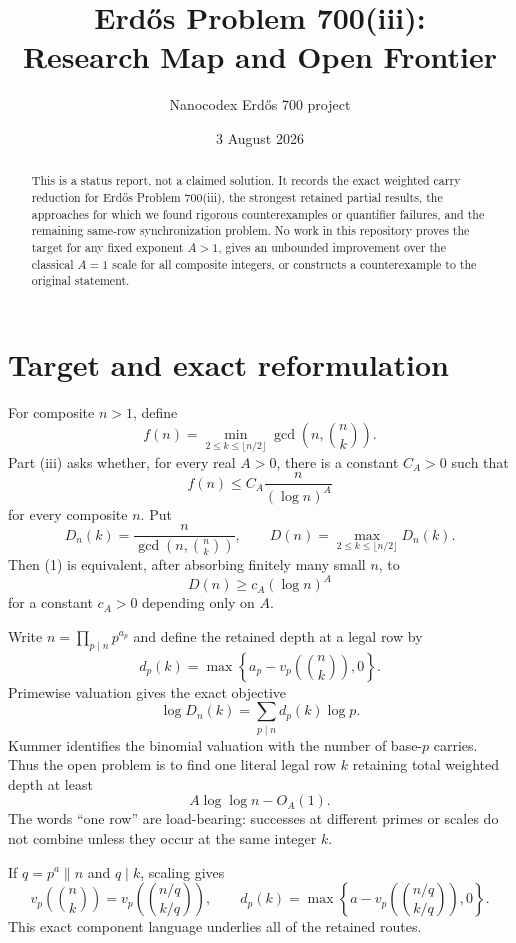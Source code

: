 \documentclass[11pt]{article}
\title{Erd\H{o}s Problem 700(iii):\\
Research Map and Open Frontier}
\author{Nanocodex Erd\H{o}s 700 project}
\date{3 August 2026}
\newcommand{\choosef}[2]{\binom{#1}{#2}}
\begin{document}
\maketitle

\begin{abstract}
This is a status report, not a claimed solution.  It records the exact
weighted carry reduction for Erd\H{o}s Problem 700(iii), the strongest
retained partial results, the approaches for which we found rigorous
counterexamples or quantifier failures, and the remaining same-row
synchronization problem.  No work in this repository proves the target for
any fixed exponent $A>1$, gives an unbounded improvement over the classical
$A=1$ scale for all composite integers, or constructs a counterexample to the
original statement.
\end{abstract}

\section{Target and exact reformulation}

For composite $n>1$, define
\[
 f(n)=\min_{2\leq k\leq\lfloor n/2\rfloor}
       \gcd\!\left(n,\choosef nk\right).
\]
Part (iii) asks whether, for every real $A>0$, there is a constant $C_A>0$
such that
\[
 f(n)\leq C_A\frac{n}{(\log n)^A}                         \tag{1}
\]
for every composite $n$.  Put
\[
 D_n(k)=\frac{n}{\gcd(n,\choosef nk)},\qquad
 D(n)=\max_{2\leq k\leq\lfloor n/2\rfloor}D_n(k).
\]
Then (1) is equivalent, after absorbing finitely many small $n$, to
\[
 D(n)\geq c_A(\log n)^A                                   \tag{2}
\]
for a constant $c_A>0$ depending only on $A$.

Write $n=\prod_{p\mid n}p^{a_p}$ and define the retained depth at a legal row
by
\[
 d_p(k)=\max\!\left\{a_p-v_p\!\left(\choosef nk\right),0\right\}.
\]
Primewise valuation gives the exact objective
\[
 \boxed{
 \log D_n(k)=\sum_{p\mid n}d_p(k)\log p.}                  \tag{3}
\]
Kummer identifies the binomial valuation with the number of base-$p$ carries.
Thus the open problem is to find one literal legal row $k$ retaining total
weighted depth at least
\[
 A\log\log n-O_A(1).                                      \tag{4}
\]
The words ``one row'' are load-bearing: successes at different primes or
scales do not combine unless they occur at the same integer $k$.

If $q=p^a\parallel n$ and $q\mid k$, scaling gives
\[
 v_p\!\left(\choosef nk\right)
 =v_p\!\left(\choosef{n/q}{k/q}\right),
 \qquad
 d_p(k)=\max\!\left\{a-v_p\!\left(\choosef{n/q}{k/q}\right),0\right\}.
                                                                    \tag{5}
\]
This exact component language underlies all of the retained routes.
\end{document}
